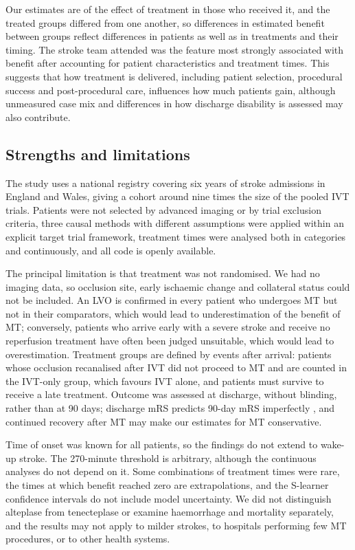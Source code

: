 Our estimates are of the effect of treatment in those who received it, and the treated groups differed from one another, so differences in estimated benefit between groups reflect differences in patients as well as in treatments and their timing. The stroke team attended was the feature most strongly associated with benefit after accounting for patient characteristics and treatment times. This suggests that how treatment is delivered, including patient selection, procedural success and post-procedural care, influences how much patients gain, although unmeasured case mix and differences in how discharge disability is assessed may also contribute.

\subsection{Strengths and limitations}

The study uses a national registry covering six years of stroke admissions in England and Wales, giving a cohort around nine times the size of the pooled IVT trials. Patients were not selected by advanced imaging or by trial exclusion criteria, three causal methods with different assumptions were applied within an explicit target trial framework, treatment times were analysed both in categories and continuously, and all code is openly available.

The principal limitation is that treatment was not randomised. We had no imaging data, so occlusion site, early ischaemic change and collateral status could not be included. An LVO is confirmed in every patient who undergoes MT but not in their comparators, which would lead to underestimation of the benefit of MT; conversely, patients who arrive early with a severe stroke and receive no reperfusion treatment have often been judged unsuitable, which would lead to overestimation. Treatment groups are defined by events after arrival: patients whose occlusion recanalised after IVT did not proceed to MT and are counted in the IVT-only group, which favours IVT alone, and patients must survive to receive a late treatment. Outcome was assessed at discharge, without blinding, rather than at 90 days; discharge mRS predicts 90-day mRS imperfectly \cite{elhabr2021}, and continued recovery after MT may make our estimates for MT conservative.

Time of onset was known for all patients, so the findings do not extend to wake-up stroke. The 270-minute threshold is arbitrary, although the continuous analyses do not depend on it. Some combinations of treatment times were rare, the times at which benefit reached zero are extrapolations, and the S-learner confidence intervals do not include model uncertainty. We did not distinguish alteplase from tenecteplase or examine haemorrhage and mortality separately, and the results may not apply to milder strokes, to hospitals performing few MT procedures, or to other health systems.

